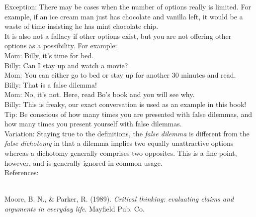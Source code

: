 \documentclass[a4paper,12pt,single,pdftex]{scrartcl}
\begin{document}
{    
      Exception: There may be cases when the number of options really is limited.  For example, if an ice cream man just has chocolate and vanilla left, it would be a waste of time insisting he has mint chocolate chip. 
    \\

    
      It is also not a fallacy if other options exist, but you are not offering other options as a possibility.  For example:
    \\

    
      Mom: Billy, it’s time for bed.
    \\

    
      Billy: Can I stay up and watch a movie?
    \\

    
      Mom: You can either go to bed or stay up for another 30 minutes and read.
    \\

    
      Billy: That is a false dilemma!
    \\

    
      Mom: No, it’s not.  Here, read Bo’s book and you will see why.
    \\

    
      Billy: This is freaky, our exact conversation is used as an example in this book!
    \\

    
      Tip: Be conscious of how many times you are presented with false dilemmas, and how many times you present yourself with false dilemmas.
    \\

    
      Variation: Staying true to the definitions, the {\it false dilemma}  is different from the {\it false dichotomy} in that a dilemma implies two equally unattractive options whereas a dichotomy generally comprises two opposites. This is a fine point, however, and is generally ignored in common usage.
    \\

    References:

    
      
        
      \\

      
        
          Moore, B. N., \& Parker, R. (1989). {\it Critical thinking: evaluating claims and arguments in everyday life}. Mayfield Pub. Co.
        
      
    
  }
\end{document}
